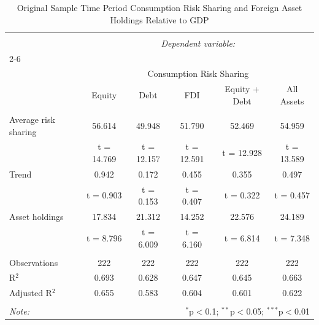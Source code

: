 
\begin{table}[!htbp] \centering 
  \caption{Original Sample Time Period Consumption Risk Sharing and Foreign Asset Holdings Relative to GDP} 
  \label{} 
\begin{tabular}{@{\extracolsep{5pt}}lccccc} 
\\[-1.8ex]\hline 
\hline \\[-1.8ex] 
 & \multicolumn{5}{c}{\textit{Dependent variable:}} \\ 
\cline{2-6} 
\\[-1.8ex] & \multicolumn{5}{c}{Consumption Risk Sharing} \\ 
 & Equity & Debt & FDI & Equity + Debt & All Assets \\ 
\hline \\[-1.8ex] 
 Average risk sharing & 56.614 & 49.948 & 51.790 & 52.469 & 54.959 \\ 
  & t = 14.769 & t = 12.157 & t = 12.591 & t = 12.928 & t = 13.589 \\ 
  Trend & 0.942 & 0.172 & 0.455 & 0.355 & 0.497 \\ 
  & t = 0.903 & t = 0.153 & t = 0.407 & t = 0.322 & t = 0.457 \\ 
  Asset holdings & 17.834 & 21.312 & 14.252 & 22.576 & 24.189 \\ 
  & t = 8.796 & t = 6.009 & t = 6.160 & t = 6.814 & t = 7.348 \\ 
 \hline \\[-1.8ex] 
Observations & 222 & 222 & 222 & 222 & 222 \\ 
R$^{2}$ & 0.693 & 0.628 & 0.647 & 0.645 & 0.663 \\ 
Adjusted R$^{2}$ & 0.655 & 0.583 & 0.604 & 0.601 & 0.622 \\ 
\hline 
\hline \\[-1.8ex] 
\textit{Note:}  & \multicolumn{5}{r}{$^{*}$p$<$0.1; $^{**}$p$<$0.05; $^{***}$p$<$0.01} \\ 
\end{tabular} 
\end{table} 
